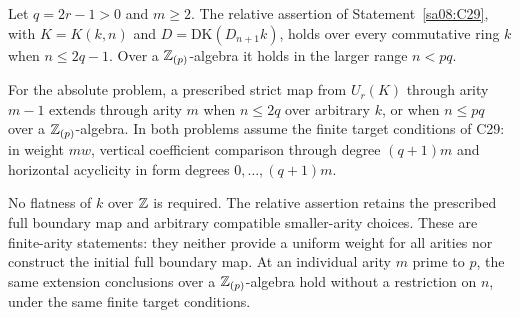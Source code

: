 \begin{corollary}
\label{sa08:C36}
Let $q=2r-1>0$ and $m\geq2$. The relative assertion of
Statement~\ref{sa08:C29}, with $K=K(k,n)$ and
$D=\mathrm{DK}(D_{n+1}k)$, holds over every commutative ring
$k$ when $n\leq2q-1$. Over a $\mathbb Z_{(p)}$-algebra it holds
in the larger range $n<pq$.

For the absolute problem, a prescribed strict map from $U_r(K)$
through arity $m-1$ extends through arity $m$ when $n\leq2q$
over arbitrary $k$, or when $n\leq pq$ over a
$\mathbb Z_{(p)}$-algebra. In both problems assume the finite target
conditions of C29: in weight $mw$, vertical coefficient comparison
through degree $(q+1)m$ and horizontal acyclicity in form degrees
$0,\ldots,(q+1)m$.

No flatness of $k$ over $\mathbb Z$ is required. The relative assertion
retains the prescribed full boundary map and arbitrary compatible
smaller-arity choices. These are finite-arity statements: they neither
provide a uniform weight for all arities nor construct the initial
full boundary map. At an individual arity $m$ prime to $p$, the
same extension conclusions over a $\mathbb Z_{(p)}$-algebra hold without
a restriction on $n$, under the same finite target conditions.
\end{corollary}
